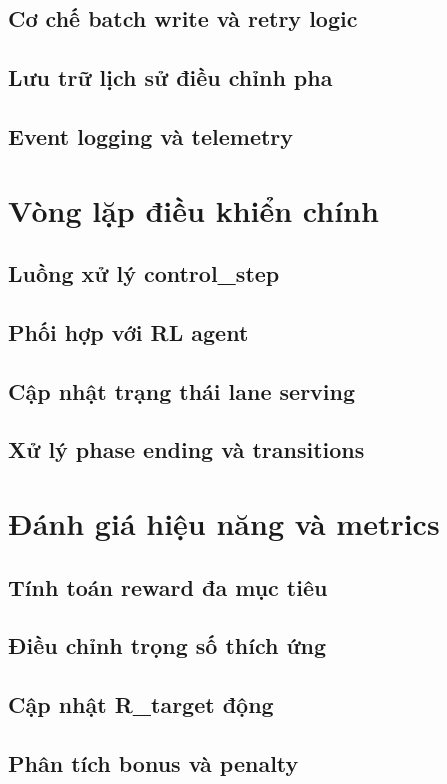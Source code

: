 \documentclass[12pt,a4paper,oneside]{report}
\begin{document}
\subsection{Cơ chế batch write và retry logic}
\subsection{Lưu trữ lịch sử điều chỉnh pha}
\subsection{Event logging và telemetry}

\section{Vòng lặp điều khiển chính}
\subsection{Luồng xử lý control_step}
\subsection{Phối hợp với RL agent}
\subsection{Cập nhật trạng thái lane serving}
\subsection{Xử lý phase ending và transitions}

\section{Đánh giá hiệu năng và metrics}
\subsection{Tính toán reward đa mục tiêu}
\subsection{Điều chỉnh trọng số thích ứng}
\subsection{Cập nhật R_target động}
\subsection{Phân tích bonus và penalty}
\end{document}
